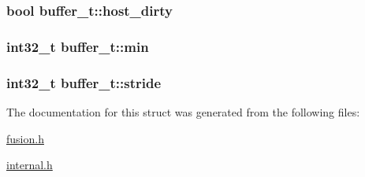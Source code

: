 \hypertarget{structbuffer__t_a73a357ef44b1417a60ec0da43e9e0868}{
\subsubsection[{host\-\_\-dirty}]{\setlength{\rightskip}{0pt plus 5cm}bool buffer\-\_\-t\-::host\-\_\-dirty}}\label{structbuffer__t_a73a357ef44b1417a60ec0da43e9e0868}
\hypertarget{structbuffer__t_a1932b10069a734ee12e242b5b929e28a}{
\subsubsection[{min}]{\setlength{\rightskip}{0pt plus 5cm}int32\-\_\-t buffer\-\_\-t\-::min}}\label{structbuffer__t_a1932b10069a734ee12e242b5b929e28a}
\hypertarget{structbuffer__t_a20a8d2dc77012a89ddfc2647ea15cb44}{
\subsubsection[{stride}]{\setlength{\rightskip}{0pt plus 5cm}int32\-\_\-t buffer\-\_\-t\-::stride}}\label{structbuffer__t_a20a8d2dc77012a89ddfc2647ea15cb44}


The documentation for this struct was generated from the following files\-:\begin{DoxyCompactItemize}
\item 
\hyperlink{fusion_8h}{fusion.\-h}\item 
\hyperlink{internal_8h}{internal.\-h}\end{DoxyCompactItemize}
